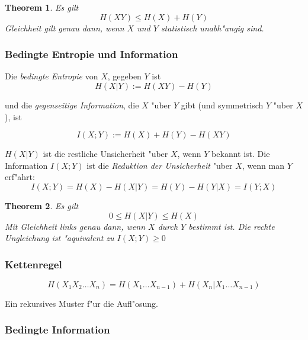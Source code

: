 \documentclass[german, 10pt, a4paper, twocolumn]{scrartcl}
\newtheorem{theorem}{Theorem}
\begin{document}
\begin{theorem}
	Es gilt
	\begin{displaymath}
		H(XY) \leq H(X) + H(Y)
	\end{displaymath}
	Gleichheit gilt genau dann, wenn $X$ und $Y$ statistisch unabh"angig sind.
\end{theorem}

\subsubsection{Bedingte Entropie und Information}

Die \textit{bedingte Entropie} von $X$, gegeben $Y$ ist 
\begin{displaymath}
	H(X|Y) := H(XY) - H(Y)
\end{displaymath}

und die \textit{gegenseitige Information}, die $X$ "uber $Y$ gibt (und symmetrisch $Y$ "uber $X$), ist

\begin{displaymath}
	I(X;Y) := H(X) + H(Y) - H(XY)
\end{displaymath}

$H(X|Y)$ ist die restliche Unsicherheit "uber $X$, wenn $Y$ bekannt ist. Die Information $I(X;Y)$ ist die \textit{Reduktion der Unsicherheit} "uber $X$, wenn man $Y$ erf"ahrt:
\begin{displaymath}
	I(X;Y) = H(X) - H(X|Y) = H(Y) - H(Y|X) = I(Y;X)
\end{displaymath}

\begin{theorem}
	Es gilt
	\begin{displaymath}
		0 \leq H(X|Y) \leq H(X)
	\end{displaymath}
	Mit Gleichheit links genau dann, wenn $X$ durch $Y$ bestimmt ist. Die rechte Ungleichung ist "aquivalent zu $I(X;Y)\geq 0$
\end{theorem}

\subsubsection{Kettenregel}

\begin{displaymath}
	H(X_1 X_2 \ldots X_{n}) = H(X_1\ldots X_{n-1}) + H(X_{n}|X_1\ldots X_{n-1})
\end{displaymath}

Ein rekursives Muster f"ur die Aufl"osung.

\subsubsection{Bedingte Information}
\end{document}
